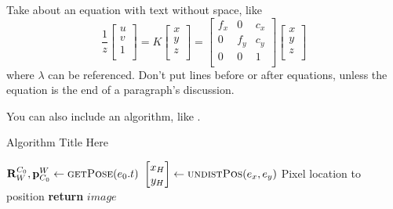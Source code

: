 Take about an equation with text without space, like
\begin{equation}
\label{eq:eqRefNameHere}
\frac{1}{z}
\begin{bmatrix}
u \\
v \\
1 \\
\end{bmatrix}=
K \begin{bmatrix}
x \\
y \\
z \\
\end{bmatrix}=
\begin{bmatrix}
f_x & 0 & c_x \\
0 & f_y & c_y \\
0 & 0 & 1 \\
\end{bmatrix}
\begin{bmatrix}
x \\
y \\
z \\
\end{bmatrix}
\end{equation}
where $\lambda$ can be referenced. Don't put lines before or after equations, unless the equation is the end of a paragraph's discussion. 

You can also include an algorithm, like . 

\begin{algorithm}[tb!]
	\caption{Algorithm Title Here}
	\label{alg:algorithmRefName}
	\begin{algorithmic}[1] %
		\State $\mathbf{R}^{C_0}_W,\mathbf{p}^W_{C_0} \gets \textsc{getPose}(e_0.t)$		
		 
		\State $\begin{bmatrix}x_H \\ y_H \end{bmatrix}  \gets \textsc{undistPos}(e_x,e_y)$ \Comment Pixel location to position
		\label{alg:line:lineRefName} %
		\EndFor
		\State \textbf{return} $image$
		\EndFunction
	\end{algorithmic}
\end{algorithm}
